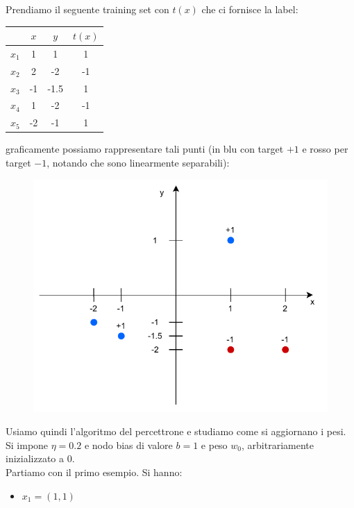 					\begin{esercizio}
						Prendiamo il seguente training set con $t(x)$ che ci fornisce la label:
						\begin{table}[H]
							\centering
							\begin{tabular}{c||c|c|c}
								      & $x$ & $y$  & $t(x)$ \\
								\hline
								\hline
								$x_1$ & 1   & 1    & 1      \\
								$x_2$ & 2   & -2   & -1     \\
								$x_3$ & -1  & -1.5 & 1      \\
								$x_4$ & 1   & -2   & -1     \\
								$x_5$ & -2  & -1   & 1      \\
							\end{tabular}
						\end{table}
						graficamente possiamo rappresentare tali punti (in blu con target $+1$ e rosso
						per target $-1$, notando che sono linearmente separabili):
						\begin{figure}[H]
							\centering
							\includegraphics[scale = 0.8]{img/per1.pdf}
						\end{figure}
						Usiamo quindi l'algoritmo del percettrone e studiamo come si aggiornano i
						pesi. Si impone $\eta=0.2$ e nodo bias di valore $b=1$ e peso $w_0$,
						arbitrariamente inizializzato a 0.\\ 
						Partiamo con il primo esempio. Si hanno:
						\begin{itemize}
							\item $x_1=(1, 1)$

\end{itemize}
\end{esercizio}
